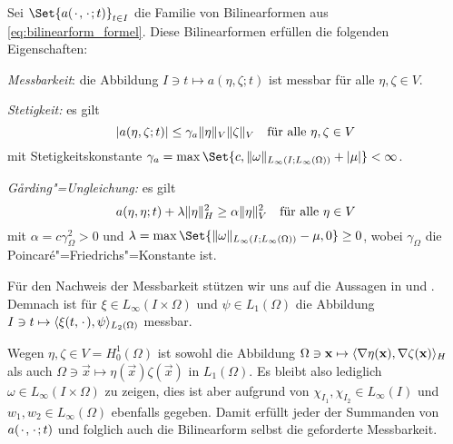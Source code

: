 \begin{Satz}
\label{satz:bilinearform_messbar_stetig_garding}
    Sei $\Set{a(\blank, \blank; t)}_{t \in I}$ die Familie von Bilinearformen aus \cref{eq:bilinearform_formel}.
    Diese Bilinearformen erfüllen die folgenden Eigenschaften:
    \begin{thmenumerate}
        \item\label{satz:bilinearform_messbar_stetig_garding:messbar}
        \emph{Messbarkeit}: die Abbildung $I \ni t \mapsto a(\eta, \zeta; t)$ ist messbar für alle $\eta, \zeta \in V$.
        \item\label{satz:bilinearform_messbar_stetig_garding:stetig}
        \emph{Stetigkeit:} es gilt
        \begin{equation}
            \label{eq:bilinearform_messbar_stetig_garding:stetig}
            \lvert a(\eta, \zeta; t)\rvert \leq \gamma_{a} \lVert\eta\rVert_{V} \lVert\zeta\rVert_{V} \quad \text{für alle}~\eta, \zeta \in V
        \end{equation}
        mit Stetigkeitskonstante $\gamma_{a} = \max\Set{c, \norm{\omega}_{L_{\infty}(I; L_{\infty}(\Omega))} + \abs{\mu}} < \infty$.
        \item\label{satz:bilinearform_messbar_stetig_garding:garding}
        \emph{G\aa{}rding"=Ungleichung:} es gilt
        \begin{equation}
            \label{eq:bilinearform_messbar_stetig_garding:garding}
            a(\eta, \eta; t) + \lambda \lVert\eta\rVert_{H}^{2} \geq \alpha \lVert\eta\rVert_{V}^{2} \quad \text{für alle}~\eta \in V
        \end{equation}
        mit $\alpha = c \gamma_{\Omega}^{2} > 0$ und $\lambda = \max\Set{\norm{\omega}_{L_{\infty}(I; L_{\infty}(\Omega))} - \mu, 0} \geq 0$, wobei $\gamma_{\Omega}$ die Poincaré"=Friedrichs"=Konstante ist.
    \end{thmenumerate}

    \begin{Beweis}
        Für den Nachweis der Messbarkeit stützen wir uns auf die Aussagen in \cite[177]{fattorini2005infinite} und \cite[Theorem 2.7.9, Corollary 2.7.10, Lemma 8.1.1]{Andreev:2012ep}.
        Demnach ist für $\xi \in L_{\infty}(I \times \Omega)$ und $\psi \in L_{1}(\Omega)$ die Abbildung $I \ni t \mapsto \langle\xi(t, {\mkern2mu\cdot\mkern2mu}),\psi\rangle_{L_{2}(\Omega)}$ messbar.

        Wegen $\eta, \zeta \in V = H^{1}_{0}(\Omega)$ ist sowohl die Abbildung $\Omega \ni \mathbf{x} \mapsto \langle\nabla \eta(\mathbf{x}),\nabla \zeta (\mathbf{x})\rangle_{H}$ als auch $\Omega \ni \vec x \mapsto \eta(\vec{x})\zeta (\vec x)$ in $L_{1}(\Omega)$.
        Es bleibt also lediglich $\omega \in L_{\infty}(I \times \Omega)$ zu zeigen, dies ist aber aufgrund von $\chi_{I_{1}}, \chi_{I_{2}} \in L_{\infty}(I)$ und $w_{1}, w_{2} \in L_{\infty}(\Omega)$ ebenfalls gegeben.
        Damit erfüllt jeder der Summanden von $a({\mkern2mu\cdot\mkern2mu}, {\mkern2mu\cdot\mkern2mu}; t)$ und folglich auch die Bilinearform selbst die geforderte Messbarkeit.


\end{Beweis}
\end{Satz}
